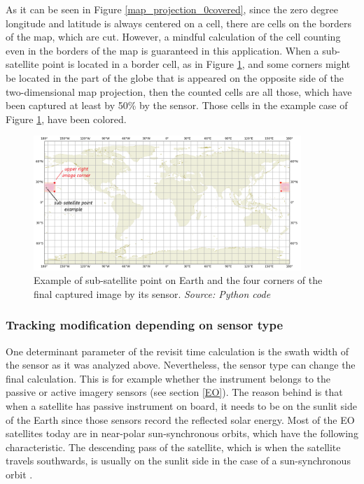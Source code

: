 As it can be seen in Figure \ref{map_projection_0covered}, since the zero degree longitude and latitude is always centered on a cell, there are cells on the borders of the map, which are cut. However, a mindful calculation of the cell counting even in the borders of the map is guaranteed in this application. When a sub-satellite point is located in a border cell, as in Figure \ref{correct_calculation}, and some corners might be located in the part of the globe that is appeared on the opposite side of the two-dimensional map projection, then the counted cells are all those, which have been captured at least by 50\% by the sensor. Those cells in the example case of Figure \ref{correct_calculation}, have been colored.

\begin{figure}
\centering
\includegraphics[width=0.9\textwidth]{Images/correct_calculation.png}\caption{Example of sub-satellite point on Earth and the four corners of the final captured image by its sensor. \textit{Source: Python code}}
\label{correct_calculation}
\end{figure}

\bigskip
\subsubsection{Tracking modification depending on sensor type}
\bigskip

One determinant parameter of the revisit time calculation is the swath width of the sensor as it was analyzed above. Nevertheless, the sensor type can change the final calculation. This is for example whether the instrument belongs to the passive or active imagery sensors (see section \ref{EO}). The reason behind is that when a satellite has passive instrument on board, it needs to be on the sunlit side of the Earth since those sensors record the reflected solar energy. Most of the EO satellites today are in near-polar sun-synchronous orbits, which have the following characteristic. The descending pass of the satellite, which is when the satellite travels southwards, is usually on the sunlit side in the case of a sun-synchronous orbit \cite{Kramer 2002}.

